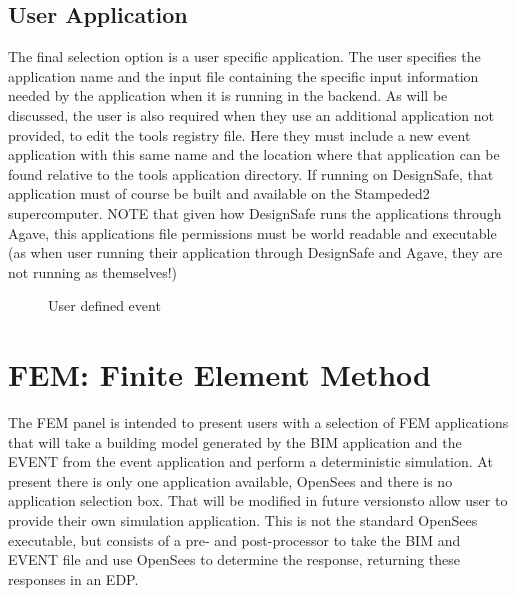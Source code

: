 \subsection{User Application}
The final selection option is a user specific application. 
The user specifies the application name and the input file containing the specific input information 
needed by the application when it is running in the backend. 
As will be discussed, the user is also required when they use an additional application not provided, 
to edit the tools registry file. Here they must include a new event application with this same name 
and the location where that application can be found relative to the tools application directory. 
If running on DesignSafe, that application must of course be built and available on the Stampeded2 supercomputer. 
NOTE that given how DesignSafe runs the applications through Agave, this applications file permissions must be 
world readable and executable (as when user running their application through DesignSafe and Agave, they are not running as themselves!)

\begin{figure}[!htbp]
  \caption{User defined event}
  \label{fig:figure8}
\end{figure}


\section{FEM: Finite Element Method}
The FEM panel is intended to present users with a selection of FEM applications that will take a building model generated by the BIM application and the EVENT from the event application and perform a deterministic simulation. 
At present there is only one application available, OpenSees and there is no application selection box.  That will be modified in future versionsto allow user to provide their own simulation application.  This is not the standard OpenSees executable, but consists of a pre- and post-processor to take the  BIM and EVENT file and use OpenSees to determine the response, returning these responses in an EDP. 


